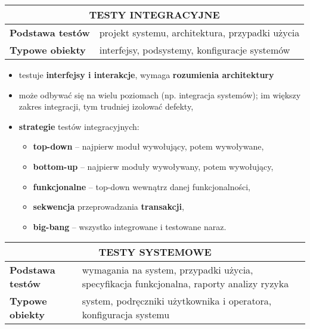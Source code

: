 \documentclass[main.tex]{subfiles}
\begin{document}
    \begin{table}[H]
        \begin{center}
            \begin{tabular}{| p{4cm}| p{12cm}|}
                \hline
                \multicolumn{2}{|c|}{ \textbf{TESTY INTEGRACYJNE}}\\
                \hline
                \textbf{Podstawa testów} & projekt systemu, architektura, przypadki użycia\\
                \hline
                \textbf{Typowe obiekty} & interfejsy, podsystemy, konfiguracje systemów\\
                \hline
            \end{tabular}
        \end{center}
    \end{table}

    \begin{itemize}[noitemsep]
        \item testuje \textbf{interfejsy i interakcje}, wymaga \textbf{rozumienia architektury}
        \item może odbywać się na wielu poziomach (np. integracja systemów); im większy zakres integracji, tym trudniej izolować defekty,
        \item \textbf{strategie} testów integracyjnych:
        \begin{itemize}[noitemsep]
            \item \textbf{top-down} -- najpierw moduł wywołujący, potem wywoływane,
            \item \textbf{bottom-up} -- najpierw moduły wywoływany, potem wywołujący,
            \item \textbf{funkcjonalne} -- top-down wewnątrz danej funkcjonalności,
            \item \textbf{sekwencja} przeprowadzania \textbf{transakcji},
            \item \textbf{big-bang} -- wszystko integrowane i testowane naraz.
        \end{itemize}
    \end{itemize}

    \begin{table}[H]
        \begin{center}
            \begin{tabular}{| p{4cm}| p{12cm}|}
                \hline
                \multicolumn{2}{|c|}{ \textbf{TESTY SYSTEMOWE}}\\
                \hline
                \textbf{Podstawa testów} & wymagania na system, przypadki użycia,
                specyfikacja funkcjonalna, raporty analizy ryzyka\\
                \hline
                \textbf{Typowe obiekty} & system, podręczniki użytkownika i operatora,
                konfiguracja systemu\\
                \hline
            \end{tabular}
        \end{center}
    \end{table}
\end{document}
